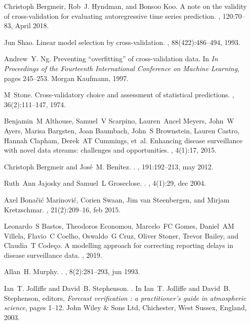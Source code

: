 \documentclass[a4paper]{article}
\begin{document}
\begin{thebibliography}{100}
Christoph Bergmeir, Rob~J. Hyndman, and Bonsoo Koo.
\newblock A note on the validity of cross-validation for evaluating
  autoregressive time series prediction.
, 120:70--83, April
  2018.

Jun Shao.
\newblock Linear model selection by cross-validation.
,
  88(422):486--494, 1993.

Andrew~Y. Ng.
\newblock Preventing ``overfitting'' of cross-validation data.
\newblock In {\em In Proceedings of the Fourteenth International Conference on
  Machine Learning}, pages 245--253. Morgan Kaufmann, 1997.

M~Stone.
\newblock Cross-validatory choice and assessment of statistical predictions.
,
  36(2):111--147, 1974.

Benjamin~M Althouse, Samuel~V Scarpino, Lauren~Ancel Meyers, John~W Ayers,
  Marisa Bargsten, Joan Baumbach, John~S Brownstein, Lauren Castro, Hannah
  Clapham, Derek~AT Cummings, et~al.
\newblock Enhancing disease surveillance with novel data streams: challenges
  and opportunities.
, 4(1):17, 2015.

Christoph Bergmeir and Jos{\'{e}}~M. Ben{\'{i}}tez.
.
, 191:192--213, may 2012.

Ruth~Ann Jajosky and Samuel~L Groseclose.
.
, 4(1):29, dec 2004.

Axel {Bona{\v{c}}i{\'{c}} Marinovi{\'{c}}}, Corien Swaan, Jim van Steenbergen,
  and Mirjam Kretzschmar.
, 21(2):209--16, feb 2015.

Leonardo~S Bastos, Theodoros Economou, Marcelo~FC Gomes, Daniel~AM Villela,
  Flavio~C Coelho, Oswaldo~G Cruz, Oliver Stoner, Trevor Bailey, and Claudia~T
  Code{\c{c}}o.
\newblock A modelling approach for correcting reporting delays in disease
  surveillance data.
, 2019.

Allan~H. Murphy.
.
, 8(2):281--293, jun 1993.

Ian~T. Jolliffe and David~B. Stephenson.
.
\newblock In Ian~T. Jolliffe and David~B. Stephenson, editors, {\em Forecast
  verification : a practitioner's guide in atmospheric science}, pages 1--12.
  John Wiley {\&} Sons Ltd, Chichester, West Sussex, England, 2003.

\end{thebibliography}
\end{document}
